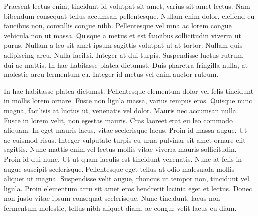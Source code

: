 \documentclass{book}
\begin{document}
Praesent lectus enim, tincidunt id volutpat sit amet, varius sit amet lectus. Nam bibendum consequat tellus accumsan
pellentesque. Nullam enim dolor, eleifend eu faucibus non, convallis congue nibh. Pellentesque vel urna ac lorem congue
vehicula non ut massa. Quisque a metus et est faucibus sollicitudin viverra ut purus. Nullam a leo sit amet ipsum
sagittis volutpat ut at tortor. Nullam quis adipiscing arcu. Nulla facilisi. Integer at dui turpis. Suspendisse luctus
rutrum dui ac mattis. In hac habitasse platea dictumst. Duis pharetra fringilla nulla, at molestie arcu fermentum
eu. Integer id metus vel enim auctor rutrum.

In hac habitasse platea dictumst. Pellentesque elementum dolor vel felis tincidunt in mollis lorem ornare. Fusce non
ligula massa, varius tempus eros. Quisque nunc magna, facilisis at luctus ut, venenatis vel dolor. Mauris nec accumsan
nulla. Fusce in lorem velit, non egestas mauris. Cras laoreet erat eu leo commodo aliquam. In eget mauris lacus, vitae
scelerisque lacus. Proin id massa augue. Ut ac euismod risus. Integer vulputate turpis eu urna pulvinar sit amet ornare
elit sagittis. Nunc mattis enim vel lectus mollis vitae viverra mauris sollicitudin. Proin id dui nunc. Ut ut quam
iaculis est tincidunt venenatis. Nunc at felis in augue suscipit scelerisque. Pellentesque eget tellus at odio malesuada
mollis aliquet ut magna. Suspendisse velit augue, rhoncus ut tempor non, tincidunt vel ligula. Proin elementum arcu sit
amet eros hendrerit lacinia eget et lectus. Donec non justo vitae ipsum consequat scelerisque. Nunc tincidunt, lacus non
fermentum molestie, tellus nibh aliquet diam, ac congue velit lacus eu diam.
\end{document}
